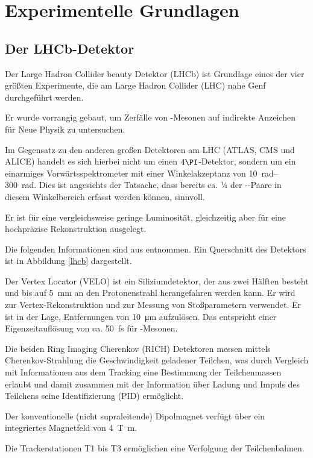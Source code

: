 \section{Experimentelle Grundlagen}

\subsection{Der LHCb-Detektor}

Der Large Hadron Collider beauty Detektor (LHCb) ist Grundlage eines der vier größten Experimente, die am Large Hadron Collider (LHC) nahe Genf durchgeführt werden.

Er wurde vorrangig gebaut, um Zerfälle von \PB-Mesonen auf indirekte Anzeichen für Neue Physik zu untersuchen.

Im Gegensatz zu den anderen großen Detektoren am LHC (ATLAS, CMS und ALICE) handelt es sich hierbei nicht um einen $4\PI$-Detektor, sondern um ein einarmiges Vorwärtsspektrometer mit einer Winkelakzeptanz von \SIrange{10}{300}{\radian}. Dies ist angesichts der Tatsache, dass bereits ca. ¼ der \PB-\PaB-Paare in diesem Winkelbereich erfasst werden können, sinnvoll.

Er ist für eine vergleichsweise geringe Luminosität, gleichzeitig aber für eine hochpräzise Rekonstruktion ausgelegt.

Die folgenden Informationen sind aus \cite{lhcb} entnommen.
Ein Querschnitt des Detektors ist in Abbildung \ref{lhcb} dargestellt.

Der Vertex Locator (VELO) ist ein Siliziumdetektor, der aus zwei Hälften besteht und bis auf \SI{5}{\milli\metre} an den Protonenstrahl herangefahren werden kann. Er wird zur Vertex-Rekonstruktion und zur Messung von Stoßparametern verwendet. Er ist in der Lage, Entfernungen von \SI{10}{\micro\metre} aufzulösen.
Das entspricht einer Eigenzeitauflösung von ca. \SI{50}{\femto\second} für \PB-Mesonen.

Die beiden Ring Imaging Cherenkov (RICH) Detektoren messen mittels Cherenkov-Strahlung die Geschwindigkeit geladener Teilchen, was durch Vergleich mit Informationen aus dem Tracking eine Bestimmung der Teilchenmassen erlaubt und damit zusammen mit der Information über Ladung und Impuls des Teilchens seine Identifizierung (PID) ermöglicht.

Der konventionelle (nicht supraleitende) Dipolmagnet verfügt über ein integriertes Magnetfeld von \SI{4}{\tesla\meter}.

Die Trackerstationen T1 bis T3 ermöglichen eine Verfolgung der Teilchenbahnen.

